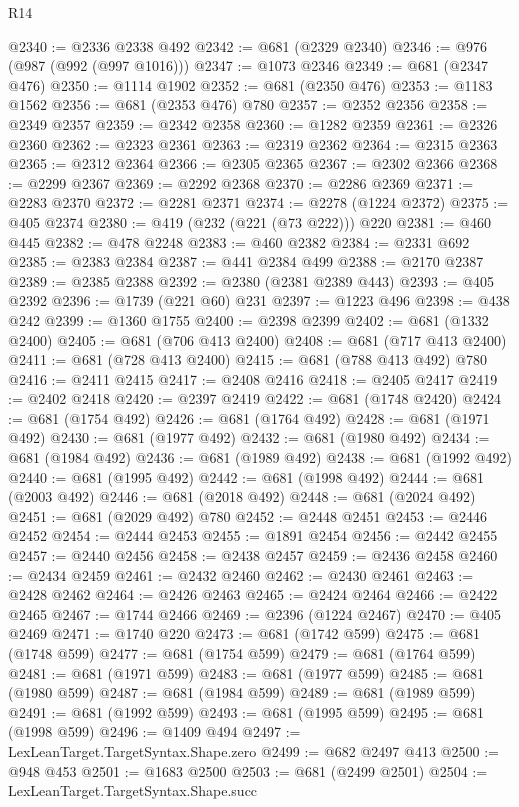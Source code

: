 \begin{lexlean}{R14}
\begin{coremodule}
@2340 := @2336 @2338 @492
@2342 := @681 (@2329 @2340)
@2346 := @976 (@987 (@992 (@997 @1016)))
@2347 := @1073 @2346
@2349 := @681 (@2347 @476)
@2350 := @1114 @1902
@2352 := @681 (@2350 @476)
@2353 := @1183 @1562
@2356 := @681 (@2353 @476) @780
@2357 := @2352 @2356
@2358 := @2349 @2357
@2359 := @2342 @2358
@2360 := @1282 @2359
@2361 := @2326 @2360
@2362 := @2323 @2361
@2363 := @2319 @2362
@2364 := @2315 @2363
@2365 := @2312 @2364
@2366 := @2305 @2365
@2367 := @2302 @2366
@2368 := @2299 @2367
@2369 := @2292 @2368
@2370 := @2286 @2369
@2371 := @2283 @2370
@2372 := @2281 @2371
@2374 := @2278 (@1224 @2372)
@2375 := @405 @2374
@2380 := @419 (@232 (@221 (@73 @222))) @220
@2381 := @460 @445
@2382 := @478 @2248
@2383 := @460 @2382
@2384 := @2331 @692
@2385 := @2383 @2384
@2387 := @441 @2384 @499
@2388 := @2170 @2387
@2389 := @2385 @2388
@2392 := @2380 (@2381 @2389 @443)
@2393 := @405 @2392
@2396 := @1739 (@221 @60) @231
@2397 := @1223 @496
@2398 := @438 @242
@2399 := @1360 @1755
@2400 := @2398 @2399
@2402 := @681 (@1332 @2400)
@2405 := @681 (@706 @413 @2400)
@2408 := @681 (@717 @413 @2400)
@2411 := @681 (@728 @413 @2400)
@2415 := @681 (@788 @413 @492) @780
@2416 := @2411 @2415
@2417 := @2408 @2416
@2418 := @2405 @2417
@2419 := @2402 @2418
@2420 := @2397 @2419
@2422 := @681 (@1748 @2420)
@2424 := @681 (@1754 @492)
@2426 := @681 (@1764 @492)
@2428 := @681 (@1971 @492)
@2430 := @681 (@1977 @492)
@2432 := @681 (@1980 @492)
@2434 := @681 (@1984 @492)
@2436 := @681 (@1989 @492)
@2438 := @681 (@1992 @492)
@2440 := @681 (@1995 @492)
@2442 := @681 (@1998 @492)
@2444 := @681 (@2003 @492)
@2446 := @681 (@2018 @492)
@2448 := @681 (@2024 @492)
@2451 := @681 (@2029 @492) @780
@2452 := @2448 @2451
@2453 := @2446 @2452
@2454 := @2444 @2453
@2455 := @1891 @2454
@2456 := @2442 @2455
@2457 := @2440 @2456
@2458 := @2438 @2457
@2459 := @2436 @2458
@2460 := @2434 @2459
@2461 := @2432 @2460
@2462 := @2430 @2461
@2463 := @2428 @2462
@2464 := @2426 @2463
@2465 := @2424 @2464
@2466 := @2422 @2465
@2467 := @1744 @2466
@2469 := @2396 (@1224 @2467)
@2470 := @405 @2469
@2471 := @1740 @220
@2473 := @681 (@1742 @599)
@2475 := @681 (@1748 @599)
@2477 := @681 (@1754 @599)
@2479 := @681 (@1764 @599)
@2481 := @681 (@1971 @599)
@2483 := @681 (@1977 @599)
@2485 := @681 (@1980 @599)
@2487 := @681 (@1984 @599)
@2489 := @681 (@1989 @599)
@2491 := @681 (@1992 @599)
@2493 := @681 (@1995 @599)
@2495 := @681 (@1998 @599)
@2496 := @1409 @494
@2497 := LexLeanTarget.TargetSyntax.Shape.zero
@2499 := @682 @2497 @413
@2500 := @948 @453
@2501 := @1683 @2500
@2503 := @681 (@2499 @2501)
@2504 := LexLeanTarget.TargetSyntax.Shape.succ

\end{coremodule}
\end{lexlean}

